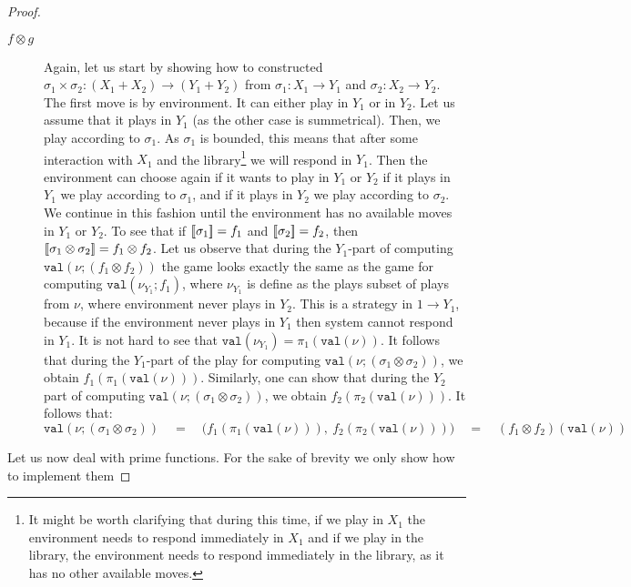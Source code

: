 \begin{proof}
\begin{description}
        \item[$f \otimes g$] Again, let us start by showing how to constructed
        $\sigma_1 \times \sigma_2 : (X_1 + X_2) \to (Y_1 + Y_2)$ from $\sigma_1 : X_1 \to Y_1$ and $\sigma_2 : X_2 \to Y_2$.
        The first move is by environment. It can either play in $Y_1$ or in $Y_2$. Let us assume that
        it plays in $Y_1$ (as the other case is summetrical). Then, we play according to 
        $\sigma_1$. As $\sigma_1$ is bounded, this means that after some interaction with $X_1$ and the library\footnote{
            It might be worth clarifying that during this time, if we play in $X_1$ the environment needs to respond
            immediately in $X_1$ and if we play in the library, the environment needs to respond immediately in the library, 
            as it has no other available moves. 
        }
        we will respond in $Y_1$. Then the environment can choose again if it wants to play in $Y_1$ or $Y_2$
        if it plays in $Y_1$ we play according to $\sigma_1$, and if it plays in $Y_2$ we play according to $\sigma_2$. 
        We continue in this fashion until the environment has no available moves in $Y_1$ or $Y_2$.
        To see that if $[{\kern-0.4ex}[\sigma_1]{\kern-0.4ex}] = f_1$ and $[{\kern-0.4ex}[\sigma_2]{\kern-0.4ex}] = f_2$, then
        $[{\kern-0.4ex}[\sigma_1 \otimes \sigma_2]{\kern-0.4ex}] = f_1 \otimes f_2$. Let us observe that during the 
        $Y_1$-part of computing $\mathtt{val}(\nu; (f_1 \otimes f_2))$ the game looks exactly the 
        same as the game for computing $\mathtt{val}(\nu_{Y_1}; f_1)$, 
        where $\nu_{Y_1}$ is define as the plays subset of plays from $\nu$, where 
        environment never plays in $Y_2$. This is a strategy in $1 \to Y_1$, because if 
        the environment never plays in $Y_1$ then system cannot respond in $Y_1$. 
        It is not hard to see that $\mathtt{val}(\nu_{Y_1}) = \pi_1(\mathtt{val}(\nu))$. 
        It follows that during the $Y_1$-part of the play for computing $\mathtt{val}(\nu; (\sigma_1 \otimes \sigma_2))$, 
        we obtain $f_1(\pi_1(\mathtt{val}(\nu)))$. Similarly, one can show that during the $Y_2$ part of computing
        $\mathtt{val}(\nu; (\sigma_1 \otimes \sigma_2))$, we obtain $f_2(\pi_2(\mathtt{val}(\nu)))$. It follows that: 
        \[ \mathtt{val}(\nu; (\sigma_1 \otimes \sigma_2)) \quad = \quad \bigl( f_1(\pi_1(\mathtt{val}(\nu))),\ f_2(\pi_2(\mathtt{val}(\nu))) \bigr) \quad = \quad (f_1 \otimes f_2) (\mathtt{val}(\nu))\]
    \end{description}
    Let us now deal with prime functions. For the sake of brevity we only show how to implement them 

\end{proof}
